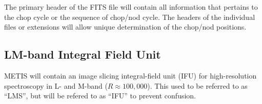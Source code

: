 The primary header of the FITS file will contain all information that
pertains to the chop cycle or the sequence of chop/nod cycle. The
headers of the individual files or extensions will allow unique
determination of the chop/nod positions.



\subsection{LM-band Integral Field Unit}
\label{ssec:instrument_data_IFU}

METIS will contain an image slicing integral-field unit (IFU) for
high-resolution spectroscopy in L- and M-band ($R\approx
100,000$).
This used to be referred to as ``\ac{LMS}'', but will be refered to as ``\ac{IFU}'' to prevent confusion.


